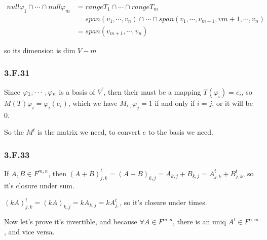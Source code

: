 \begin{equation*}
    \begin{split}
    null \varphi_{1} \cap \cdots \cap null \varphi_{m} &= range T_{1} \cap \cdots \cap range T_{m} \\
    & = span(v_{1},\cdots, v_{n}) \cap \cdots \cap span(v_{1}, \cdots, v_{m-1}, v{m+1},\cdots, v_{n}) \\
    &= span(v_{m+1}, \cdots, v_{n})
\end{split}
\end{equation*}

so its dimension is dim $V - m$

\subsubsection*{3.F.31}

Since $\varphi_{1},\cdots,\varphi_{n}$ is a basis of $V^{'}$,  then their must be a mapping 
$T(\varphi_{i}) = e_{i}$, so  $M(T)\varphi_{i} = \varphi_{i}(e_{i})$, which we have $M_{i.,}\varphi_{j} = 1$ if and only if $i = j$, or it will be 0.

So the $M^{t}$ is the matrix we need, to convert $e$ to the basis we need.


\subsubsection*{3.F.33}
If $A, B\in F^{m,n}$, then $(A+B)^{t}_{j,k} = (A+B)_{k, j} = A_{k,j} + B_{k,j} = A^{t}_{j, k} +B^{t}_{j, k}$, so it's closure under sum.

$(kA)^{t}_{j, k} = (kA)_{k, j} = kA_{k,j} = kA^{t}_{j,}$, so it's closure under times.

Now let's prove it's invertible, and because $\forall A\in F^{m,n}$, there is an uniq $A^{t} \in F^{n,m}$, and vice versa.

